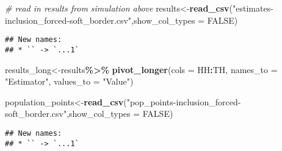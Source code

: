 \documentclass[
]{article}
\newenvironment{Shaded}{\begin{snugshade}}{\end{snugshade}}
\newcommand{\AttributeTok}[1]{\textcolor[rgb]{0.13,0.29,0.53}{#1}}
\newcommand{\CommentTok}[1]{\textcolor[rgb]{0.56,0.35,0.01}{\textit{#1}}}
\newcommand{\ConstantTok}[1]{\textcolor[rgb]{0.56,0.35,0.01}{#1}}
\newcommand{\FunctionTok}[1]{\textcolor[rgb]{0.13,0.29,0.53}{\textbf{#1}}}
\newcommand{\NormalTok}[1]{#1}
\newcommand{\OtherTok}[1]{\textcolor[rgb]{0.56,0.35,0.01}{#1}}
\newcommand{\SpecialCharTok}[1]{\textcolor[rgb]{0.81,0.36,0.00}{\textbf{#1}}}
\newcommand{\StringTok}[1]{\textcolor[rgb]{0.31,0.60,0.02}{#1}}
\begin{document}
\begin{Shaded}
\begin{Highlighting}[]
\CommentTok{\# read in results from simulation above}
\NormalTok{results}\OtherTok{\textless{}{-}}\FunctionTok{read\_csv}\NormalTok{(}\StringTok{"estimates{-}inclusion\_forced{-}soft\_border.csv"}\NormalTok{,}\AttributeTok{show\_col\_types =} \ConstantTok{FALSE}\NormalTok{)}
\end{Highlighting}
\end{Shaded}

\begin{verbatim}
## New names:
## * `` -> `...1`
\end{verbatim}

\begin{Shaded}
\begin{Highlighting}[]
\NormalTok{results\_long}\OtherTok{\textless{}{-}}\NormalTok{results}\SpecialCharTok{\%\textgreater{}\%}
  \FunctionTok{pivot\_longer}\NormalTok{(}\AttributeTok{cols =}\NormalTok{ HH}\SpecialCharTok{:}\NormalTok{TH,}
               \AttributeTok{names\_to =} \StringTok{"Estimator"}\NormalTok{, }
               \AttributeTok{values\_to =} \StringTok{"Value"}\NormalTok{)}

\NormalTok{population\_points}\OtherTok{\textless{}{-}}\FunctionTok{read\_csv}\NormalTok{(}\StringTok{"pop\_points{-}inclusion\_forced{-}soft\_border.csv"}\NormalTok{,}\AttributeTok{show\_col\_types =} \ConstantTok{FALSE}\NormalTok{)}
\end{Highlighting}
\end{Shaded}

\begin{verbatim}
## New names:
## * `` -> `...1`
\end{verbatim}
\end{document}
